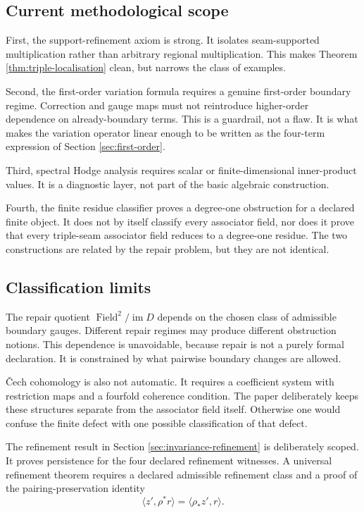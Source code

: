 \documentclass[11pt]{article}
\newcommand{\im}{\operatorname{im}}
\newcommand{\Field}{\operatorname{Field}}
\begin{document}
\subsection{Current methodological scope}

First, the support-refinement axiom is strong. It isolates seam-supported multiplication rather than arbitrary regional multiplication. This makes Theorem \ref{thm:triple-localisation} clean, but narrows the class of examples.

Second, the first-order variation formula requires a genuine first-order boundary regime. Correction and gauge maps must not reintroduce higher-order dependence on already-boundary terms. This is a guardrail, not a flaw. It is what makes the variation operator linear enough to be written as the four-term expression of Section \ref{sec:first-order}.

Third, spectral Hodge analysis requires scalar or finite-dimensional inner-product values. It is a diagnostic layer, not part of the basic algebraic construction.

Fourth, the finite residue classifier proves a degree-one obstruction for a declared finite object. It does not by itself classify every associator field, nor does it prove that every triple-seam associator field reduces to a degree-one residue. The two constructions are related by the repair problem, but they are not identical.

\subsection{Classification limits}

The repair quotient \(\Field^2/\im D\) depends on the chosen class of admissible boundary gauges. Different repair regimes may produce different obstruction notions. This dependence is unavoidable, because repair is not a purely formal declaration. It is constrained by what pairwise boundary changes are allowed.

\v{C}ech cohomology is also not automatic. It requires a coefficient system with restriction maps and a fourfold coherence condition. The paper deliberately keeps these structures separate from the associator field itself. Otherwise one would confuse the finite defect with one possible classification of that defect.

The refinement result in Section \ref{sec:invariance-refinement} is deliberately scoped. It proves persistence for the four declared refinement witnesses. A universal refinement theorem requires a declared admissible refinement class and a proof of the pairing-preservation identity
\[
\langle z',\rho^*r\rangle
=
\langle \rho_*z',r\rangle.
\]
\end{document}
